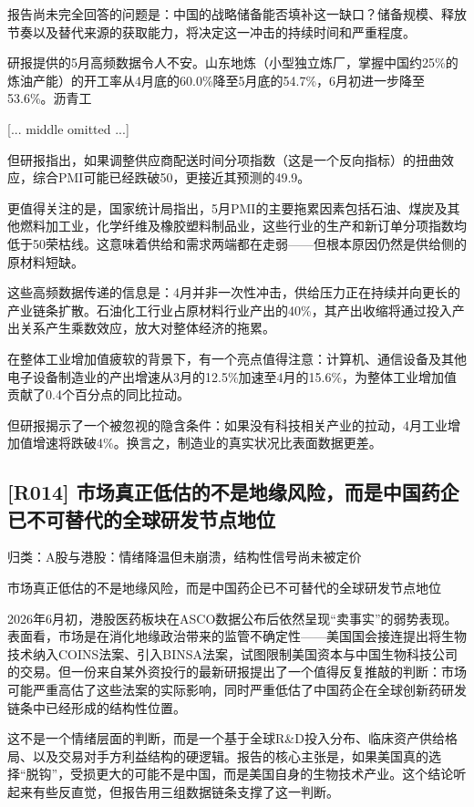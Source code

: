 \documentclass[11pt]{ctexart}
\begin{document}
报告尚未完全回答的问题是：中国的战略储备能否填补这一缺口？储备规模、释放节奏以及替代来源的获取能力，将决定这一冲击的持续时间和严重程度。

研报提供的5月高频数据令人不安。山东地炼（小型独立炼厂，掌握中国约25\%的炼油产能）的开工率从4月底的60.0\%降至5月底的54.7\%，6月初进一步降至53.6\%。沥青工

[... middle omitted ...]

但研报指出，如果调整供应商配送时间分项指数（这是一个反向指标）的扭曲效应，综合PMI可能已经跌破50，更接近其预测的49.9。

更值得关注的是，国家统计局指出，5月PMI的主要拖累因素包括石油、煤炭及其他燃料加工业，化学纤维及橡胶塑料制品业，这些行业的生产和新订单分项指数均低于50荣枯线。这意味着供给和需求两端都在走弱——但根本原因仍然是供给侧的原材料短缺。

这些高频数据传递的信息是：4月并非一次性冲击，供给压力正在持续并向更长的产业链条扩散。石油化工行业占原材料行业产出的40\%，其产出收缩将通过投入产出关系产生乘数效应，放大对整体经济的拖累。

在整体工业增加值疲软的背景下，有一个亮点值得注意：计算机、通信设备及其他电子设备制造业的产出增速从3月的12.5\%加速至4月的15.6\%，为整体工业增加值贡献了0.4个百分点的同比拉动。

但研报揭示了一个被忽视的隐含条件：如果没有科技相关产业的拉动，4月工业增加值增速将跌破4\%。换言之，制造业的真实状况比表面数据更差。

\subsection{[R014] 市场真正低估的不是地缘风险，而是中国药企已不可替代的全球研发节点地位}
{\small\color{refgray}归类：A股与港股：情绪降温但未崩溃，结构性信号尚未被定价}

市场真正低估的不是地缘风险，而是中国药企已不可替代的全球研发节点地位

2026年6月初，港股医药板块在ASCO数据公布后依然呈现“卖事实”的弱势表现。表面看，市场是在消化地缘政治带来的监管不确定性——美国国会接连提出将生物技术纳入COINS法案、引入BINSA法案，试图限制美国资本与中国生物科技公司的交易。但一份来自某外资投行的最新研报提出了一个值得反复推敲的判断：市场可能严重高估了这些法案的实际影响，同时严重低估了中国药企在全球创新药研发链条中已经形成的结构性位置。

这不是一个情绪层面的判断，而是一个基于全球R\&D投入分布、临床资产供给格局、以及交易对手方利益结构的硬逻辑。报告的核心主张是，如果美国真的选择“脱钩”，受损更大的可能不是中国，而是美国自身的生物技术产业。这个结论听起来有些反直觉，但报告用三组数据链条支撑了这一判断。
\end{document}
